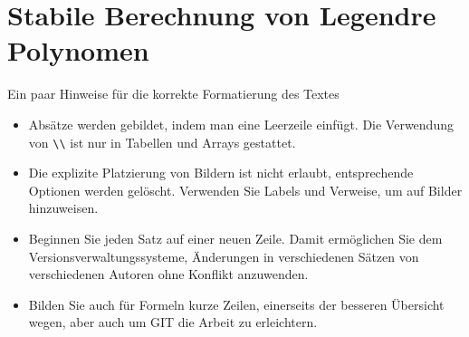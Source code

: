 %
%
%
\chapter{Stabile Berechnung von Legendre Polynomen\label{chapter:legendre}}
\begin{refsection}

Ein paar Hinweise für die korrekte Formatierung des Textes
\begin{itemize}
\item
Absätze werden gebildet, indem man eine Leerzeile einfügt.
Die Verwendung von \verb+\\+ ist nur in Tabellen und Arrays gestattet.
\item
Die explizite Platzierung von Bildern ist nicht erlaubt, entsprechende
Optionen werden gelöscht. 
Verwenden Sie Labels und Verweise, um auf Bilder hinzuweisen.
\item
Beginnen Sie jeden Satz auf einer neuen Zeile. 
Damit ermöglichen Sie dem Versionsverwaltungssysteme, Änderungen
in verschiedenen Sätzen von verschiedenen Autoren ohne Konflikt 
anzuwenden.
\item 
Bilden Sie auch für Formeln kurze Zeilen, einerseits der besseren
Übersicht wegen, aber auch um GIT die Arbeit zu erleichtern.
\end{itemize}






\printbibliography[heading=subbibliography]
\end{refsection}
